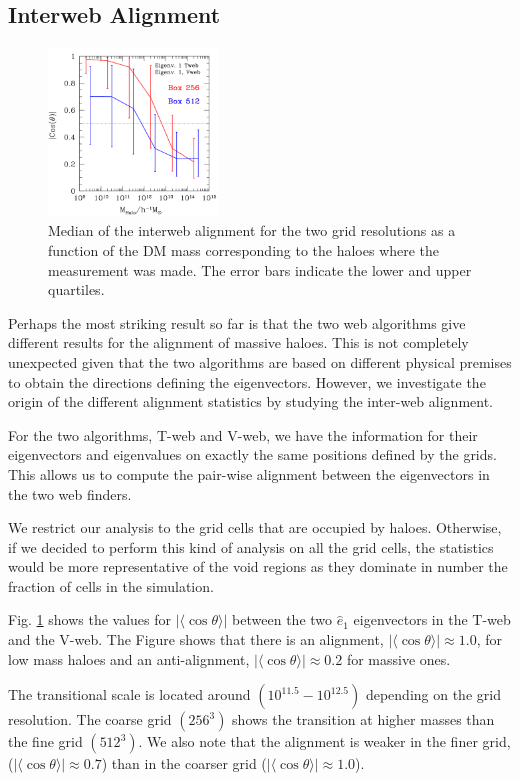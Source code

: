 \documentclass[useAMS,usenatbib]{mn2e}
\newcommand{\hMsun}{{\ifmmode{h^{-1}{\rm
        {M_{\odot}}}}\else{$h^{-1}{\rm{M_{\odot}}}$~}\fi}}
\newcommand{\muavg}{\vert\langle\cos\theta\rangle\vert}
\begin{document}
\subsection{Interweb Alignment}

\begin{figure}
\includegraphics[width=0.40\textwidth]{Fig5.pdf}
\caption{Median of the interweb alignment for the two grid
  resolutions as a function of the DM mass corresponding to
  the haloes where the measurement was made. The error bars indicate
  the lower and upper quartiles.
\label{fig:interweb}}
\end{figure}

Perhaps the most striking result so far is that the two web algorithms give
different results for the alignment of massive haloes. This is not
completely unexpected given that the two algorithms are based on
different physical premises to obtain the directions defining the
eigenvectors. However, we investigate the origin of the different
alignment statistics by studying the inter-web alignment.
 
For the two algorithms, T-web and V-web, we have the information for their
eigenvectors and eigenvalues on exactly the same positions defined
by the grids. This allows us to compute the pair-wise alignment
between the eigenvectors in the two web finders.

We restrict our analysis to the grid cells that are occupied by
haloes. Otherwise, if we decided to perform this kind of analysis on
all the grid cells, the statistics would be more representative of the void
regions as they dominate in number the fraction of cells in the
simulation.

Fig. \ref{fig:interweb} shows the values for $\muavg$ between the
two $\hat{e}_1$ eigenvectors in the T-web and the V-web.  The Figure
shows that there is an alignment, $\muavg\approx 1.0$, for low mass
haloes and an anti-alignment, $\muavg\approx 0.2$ for massive ones.

The transitional scale is located around $(10^{11.5}-10^{12.5})$\hMsun
depending on the grid resolution. The coarse grid $(256^3)$ shows the
transition at higher masses than the fine grid $(512^3)$.   We also
note that the alignment is weaker in the finer grid, ($\muavg\approx
0.7$) than in the coarser grid ($\muavg\approx1.0$). 
\end{document}
